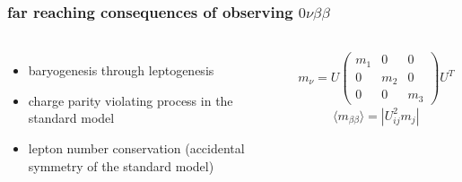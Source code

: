 \documentclass{beamer}
\begin{document}
%			
%			
	
	\begin{frame}
		\frametitle{far reaching consequences of observing $0\nu\beta\beta$}
		\begin{columns}[c] %
			
			\begin{itemize}
				\setlength\itemsep{2em}
				\item baryogenesis through leptogenesis
				\item charge parity violating process in the standard model
				\item lepton number conservation (accidental symmetry of the standard model)
			\end{itemize}
			
			\begin{gather*}
			m_{\nu} = U 
			\begin{pmatrix} m_1 & 0 & 0 \\
							0 & m_2 & 0 \\
							0 & 0 & m_3
			\end{pmatrix}
			U^{T}
			\end{gather*} 
			\begin{equation*}
			\langle m_{\beta\beta}\rangle = |U_{ij}^2 m_j|
			\end{equation*}
			
		\end{columns}
	\end{frame}	
	
	
	
	
	
\end{document}
